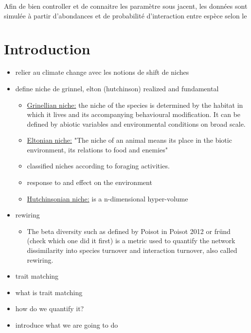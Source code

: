 \documentclass{article}
\begin{document}
Afin de bien controller et de connaitre les paramètre sous jacent, les données sont simulée à partir d'abondances et de probabilité d'interaction entre espèce selon le  

\section{Introduction}

\begin{itemize}
    \item relier au climate change avec les notions de shift de niches
    \item define niche de grinnel, elton (hutchinson) realized and fundamental
    \begin{itemize}
        \item \underline{Grinellian niche:} the niche of the species is determined by the habitat in which it lives and its accompanying behavioural modification. It can be defined by abiotic variables and environmental conditions on broad scale.
        \item \underline{Eltonian niche:} "The niche of an animal means its place in the biotic environment, its relations to food and enemies"
        \item classified niches according to foraging activities.
        \item response to and effect on the environment
        \item \underline{Hutchinsonian niche:} is a n-dimensional hyper-volume
    \end{itemize}
    \item rewiring
    \begin{itemize}
        \item The beta diversity such as defined by Poisot in Poisot 2012 or fründ (check which one did it first) is a metric used to quantify the network  dissimilarity into species turnover and interaction turnover, also called rewiring.
    \end{itemize}
    \item trait matching
        \item what is trait matching
        \item how do we quantify it?
    \item introduce what we are going to do
\end{itemize}
\end{document}
